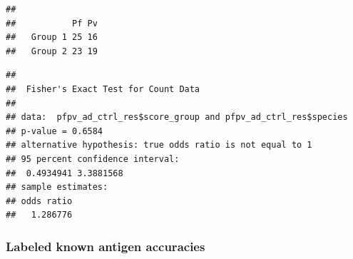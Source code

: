 \documentclass[
  11pt,
  oneside]{book}
\newenvironment{Shaded}{\begin{snugshade}}{\end{snugshade}}
\newcommand{\FunctionTok}[1]{\textcolor[rgb]{0.00,0.00,0.00}{#1}}
\newcommand{\NormalTok}[1]{#1}
\newcommand{\SpecialCharTok}[1]{\textcolor[rgb]{0.00,0.00,0.00}{#1}}
\begin{document}
\begin{verbatim}
##          
##           Pf Pv
##   Group 1 25 16
##   Group 2 23 19
\end{verbatim}

\begin{Shaded}
\end{Shaded}

\begin{verbatim}
## 
##  Fisher's Exact Test for Count Data
## 
## data:  pfpv_ad_ctrl_res$score_group and pfpv_ad_ctrl_res$species
## p-value = 0.6584
## alternative hypothesis: true odds ratio is not equal to 1
## 95 percent confidence interval:
##  0.4934941 3.3881568
## sample estimates:
## odds ratio 
##   1.286776
\end{verbatim}

\hypertarget{labeled-known-antigen-accuracies}{%
\subsubsection{Labeled known antigen accuracies}\label{labeled-known-antigen-accuracies}}
\end{document}
